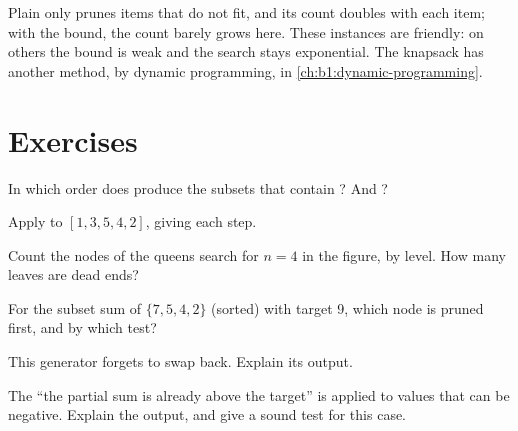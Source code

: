 Plain  only prunes items that do not fit, and its count doubles with each item; with the bound, the count
barely grows here. These instances are friendly: on others the bound is weak and the search stays exponential. The
knapsack has another method, by dynamic programming, in \cref{ch:b1:dynamic-programming}.

\section{Exercises}\label{sec:b1:backtracking:exercises}

\begin{exercise}[$\star$]\label{exo:b1:backtracking:1}
In which order does  produce the subsets that contain ? And ?
\end{exercise}

\begin{exercise}[$\star$]\label{exo:b1:backtracking:2}
Apply  to $[1, 3, 5, 4, 2]$, giving each step.
\end{exercise}

\begin{exercise}[$\star$]\label{exo:b1:backtracking:3}
Count the nodes of the queens search for $n = 4$ in the figure, by level. How many leaves are dead ends?
\end{exercise}

\begin{exercise}[$\star$]\label{exo:b1:backtracking:4}
For the subset sum of $\{7, 5, 4, 2\}$ (sorted) with target 9, which node is pruned first, and by which test?
\end{exercise}

\begin{exercise}[$\star\star$]\label{exo:b1:backtracking:5}
This generator forgets to swap back. Explain its output.
\end{exercise}

\begin{exercise}[$\star\star$]\label{exo:b1:backtracking:6}
The  ``the partial sum is already above the target'' is applied to values that can be negative. Explain the
output, and give a sound test for this case.
\end{exercise}

